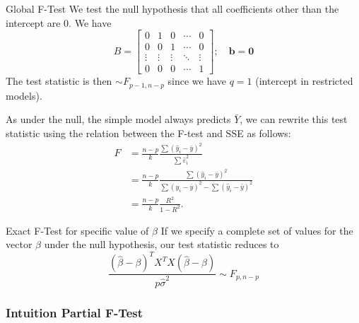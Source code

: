 \documentclass[11pt, %
	oneside, %
	english, %
	onehalfspacing, %
	]{article} %
\numberwithin{equation}{section}
\begin{document}
\begin{example}{Global F-Test}{}
    We test the null hypothesis that all coefficients other than the intercept are 0. We have
    \begin{equation*}
        B=\left[\begin{array}{ccccc}
            0 & 1 & 0 & \cdots & 0 \\
            0 & 0 & 1 & \cdots & 0 \\
            \vdots & \vdots & \vdots & \ddots & \vdots \\
            0 & 0 & 0 & \cdots & 1
            \end{array}\right];
            \quad
            \mathbf{b} = \mathbf{0}
    \end{equation*}
    The test statistic is then $\sim F_{p-1, n-p}$ since we have $q = 1$ (intercept in restricted models).

    As under the null, the simple model always predicts $\bar{Y}$, we can rewrite this test statistic using the relation between the F-test and SSE as follows:
    \begin{equation*}
        \begin{aligned}
            F & =\frac{n-p}{k} \frac{\sum\left(\hat{y}_i-\bar{y}\right)^2}{\sum \hat{\varepsilon}_i^2} \\
            & =\frac{n-p}{k} \frac{\sum\left(\hat{y}_i-\bar{y}\right)^2}{\sum\left(y_i-\bar{y}\right)^2-\sum\left(\hat{y}_i-\bar{y}\right)^2} \\
            &= \frac{n-p}{k} \frac{R^2}{1-R^2} .
            \end{aligned}
    \end{equation*}

\end{example}

\begin{example}{Exact F-Test for specific value of $\beta$}{}
    If we specify a complete set of values for the vector $\beta$ under the null hypothesis, our test statistic reduces to
    \begin{equation*}
        \frac{(\widehat{\beta}-\beta)^T X^T X(\widehat{\beta}-\beta)}{p \widehat{\sigma}^2} \sim F_{p, n-p}
    \end{equation*}
\end{example}



\subsubsection*{Intuition Partial F-Test}
\end{document}
